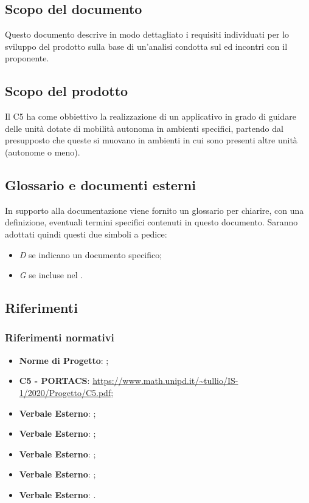 \subsection{Scopo del documento}
Questo documento descrive in modo dettagliato i requisiti individuati per lo sviluppo del prodotto sulla base di un'analisi condotta sul  ed incontri con il proponente.

\subsection{Scopo del prodotto}
Il  C5 ha come obbiettivo la realizzazione di un applicativo  in grado di guidare delle unità dotate di mobilità autonoma in ambienti specifici, partendo dal presupposto che queste si muovano in ambienti in cui sono presenti altre unità (autonome o meno).

\subsection{Glossario e documenti esterni}
In supporto alla documentazione viene fornito un glossario per chiarire, con una definizione, eventuali termini specifici contenuti in questo documento.
Saranno adottati quindi questi due simboli a pedice:
\begin{itemize}
    \item \textit{D} se indicano un documento specifico;
    \item \textit{G} se incluse nel .
\end{itemize}

\subsection{Riferimenti}
    \subsubsection{Riferimenti normativi}
    \begin{itemize}
        \item \textbf{Norme di Progetto}: ;
        \item \textbf{{ C5 - PORTACS}}: \url{https://www.math.unipd.it/~tullio/IS-1/2020/Progetto/C5.pdf};
        \item \textbf{Verbale Esterno}: ;
        \item \textbf{Verbale Esterno}: ;
        \item \textbf{Verbale Esterno}: ;
        \item \textbf{Verbale Esterno}: ;
        \item \textbf{Verbale Esterno}: .
    \end{itemize}
